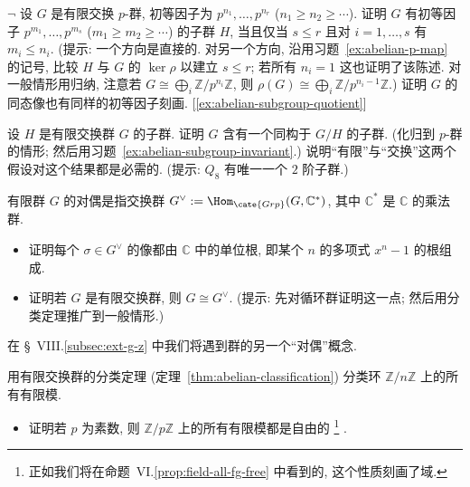 \begin{prob}
\label{ex:abelian-subgroup-invariant}
$\neg$ 设 $G$ 是有限交换 $p$-群, 初等因子为 $p^{n_1}, \dots, p^{n_r}$ ($n_1 \geq n_2 \geq \cdots$). 证明 $G$ 有初等因子 $p^{m_1}, \dots, p^{m_s}$ ($m_1 \geq m_2 \geq \cdots$) 的子群 $H$, 当且仅当 $s \leq r$ 且对 $i = 1, \dots, s$ 有 $m_i \leq n_i$. (提示: 一个方向是直接的. 对另一个方向, 沿用习题~\ref{ex:abelian-p-map} 的记号, 比较 $H$ 与 $G$ 的 $\ker \rho$ 以建立 $s \leq r$; 若所有 $n_i = 1$ 这也证明了该陈述. 对一般情形用归纳, 注意若 $G \cong \bigoplus_i \mathbb{Z}/p^{n_i}\mathbb{Z}$, 则 $\rho(G) \cong \bigoplus_i \mathbb{Z}/p^{n_i-1}\mathbb{Z}$.) 证明 $G$ 的同态像也有同样的初等因子刻画. [\ref{ex:abelian-subgroup-quotient}]
\end{prob}

\begin{prob}
\label{ex:abelian-subgroup-quotient}
设 $H$ 是有限交换群 $G$ 的子群. 证明 $G$ 含有一个同构于 $G/H$ 的子群. (化归到 $p$-群的情形; 然后用习题~\ref{ex:abelian-subgroup-invariant}.) 说明``有限''与``交换''这两个假设对这个结果都是必需的. (提示: $Q_8$ 有唯一一个 $2$ 阶子群.)
\end{prob}

\begin{prob}
\label{ex:abelian-dual}
有限群 $G$ 的对偶是指交换群 $G^{\vee} := \Hom_{\cate{Grp}}(G, \mathbb{C}^{*})$, 其中 $\mathbb{C}^{*}$ 是 $\mathbb{C}$ 的乘法群.
\begin{itemize}
\item 证明每个 $\sigma \in G^{\vee}$ 的像都由 $\mathbb{C}$ 中的单位根, 即某个 $n$ 的多项式 $x^n - 1$ 的根组成.
\item 证明若 $G$ 是有限交换群, 则 $G \cong G^{\vee}$. (提示: 先对循环群证明这一点; 然后用分类定理推广到一般情形.)
\end{itemize}
在 \S~VIII.\ref{subsec:ext-g-z} 中我们将遇到群的另一个``对偶''概念.
\end{prob}

\begin{prob}
\label{ex:abelian-zn-modules}
用有限交换群的分类定理 (定理~\ref{thm:abelian-classification}) 分类环 $\mathbb{Z}/n\mathbb{Z}$ 上的所有有限模.
\begin{itemize}
\item 证明若 $p$ 为素数, 则 $\mathbb{Z}/p\mathbb{Z}$ 上的所有有限模都是自由的%
\footnote{正如我们将在命题~VI.\ref{prop:field-all-fg-free} 中看到的, 这个性质刻画了域.}%
.
\end{itemize}
\end{prob}

